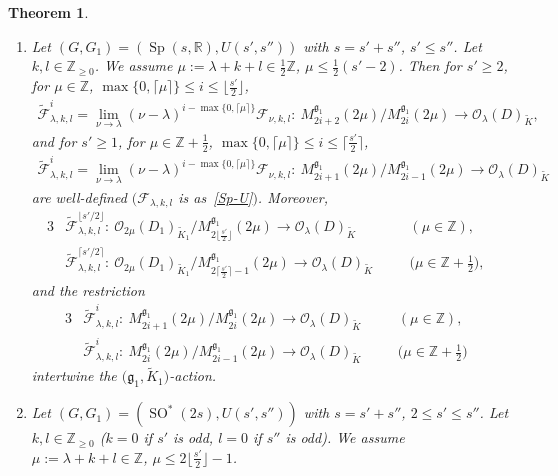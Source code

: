 \documentclass[pdftex]{sigma}
\numberwithin{equation}{section}
\newtheorem{Theorem}{Theorem}[section]
\newcommand{\BZ}{\mathbb{Z}}
\newcommand{\BR}{\mathbb{R}}
\newcommand{\fg}{\mathfrak{g}}
\newcommand{\cF}{\mathcal{F}}
\newcommand{\cO}{\mathcal{O}}
\begin{document}
\begin{Theorem}\quad
\begin{enumerate}\itemsep=0pt
\item[$(1)$] Let $(G,G_1)=(\operatorname{Sp}(s,\BR),U(s',s''))$ with $s=s'+s''$, $s'\le s''$. Let $k,l\in\BZ_{\ge 0}$. We assume $\mu:=\lambda+k+l\in\frac{1}{2}\BZ$, $\mu\le \frac{1}{2}(s'-2)$. Then for $s'\ge 2$, for $\mu\in\BZ$, $\max\{0,\lceil\mu\rceil\}\le i\le \big\lfloor \frac{s'}{2}\big\rfloor$,
\begin{gather*} \tilde{\cF}^i_{\lambda,k,l}=\lim_{\nu\to\lambda}(\nu-\lambda)^{i-\max\{0,\lceil \mu\rceil\}}\cF_{\nu,k,l}
\colon \ M_{2i+2}^{\fg_1}(2\mu)/M_{2i}^{\fg_1}(2\mu)\to \cO_\lambda(D)_{\tilde{K}}, \end{gather*}
and for $s'\ge 1$, for $\mu\in\BZ+\frac{1}{2}$, $\max\{0,\lceil\mu\rceil\}\le i\le \big\lceil \frac{s'}{2}\big\rceil$,
\begin{gather*} \tilde{\cF}^i_{\lambda,k,l}=\lim_{\nu\to\lambda}(\nu-\lambda)^{i-\max\{0,\lceil \mu\rceil\}}\cF_{\nu,k,l}
\colon \ M_{2i+1}^{\fg_1}(2\mu)/M_{2i-1}^{\fg_1}(2\mu)\to \cO_\lambda(D)_{\tilde{K}} \end{gather*}
are well-defined $(\cF_{\lambda,k,l}$ is as~\eqref{Sp-U}$)$. Moreover,
\begin{alignat*}{3}
&\tilde{\cF}^{\lfloor s'/2\rfloor}_{\lambda,k,l}\colon \ \cO_{2\mu}(D_1)_{\tilde{K}_1}
/M_{2\lfloor \frac{s'}{2}\rfloor}^{\fg_1}(2\mu)\longrightarrow \cO_\lambda(D)_{\tilde{K}}\quad && (\mu\in\BZ), &\\
&\tilde{\cF}^{\lceil s'/2\rceil}_{\lambda,k,l}\colon \ \cO_{2\mu}(D_1)_{\tilde{K}_1}
/M_{2\lceil \frac{s'}{2}\rceil-1}^{\fg_1}(2\mu)\longrightarrow \cO_\lambda(D)_{\tilde{K}} \quad & &\big(\mu\in\BZ+\tfrac{1}{2}\big),&
\end{alignat*}
and the restriction
\begin{alignat*}{3}
&\tilde{\cF}^i_{\lambda,k,l}\colon \ M_{2i+1}^{\fg_1}(2\mu)/M_{2i}^{\fg_1}(2\mu)\to \cO_\lambda(D)_{\tilde{K}} \quad && (\mu\in\BZ),& \\
&\tilde{\cF}^i_{\lambda,k,l}\colon \ M_{2i}^{\fg_1}(2\mu)/M_{2i-1}^{\fg_1}(2\mu)\to \cO_\lambda(D)_{\tilde{K}} \quad && \big(\mu\in\BZ+\tfrac{1}{2}\big)&
\end{alignat*}
intertwine the $\big(\fg_1,\tilde{K}_1\big)$-action.
\item[$(2)$] Let $(G,G_1)=(\operatorname{SO}^*(2s),U(s',s''))$ with $s=s'+s''$, $2\le s'\le s''$.
Let $k,l\in\BZ_{\ge 0}$ ($k=0$ if $s'$ is odd, $l=0$ if $s''$ is odd).
We assume $\mu:=\lambda+k+l\in\BZ$, $\mu\le 2\big\lfloor \frac{s'}{2}\big\rfloor-1$.

\end{enumerate}
\end{Theorem}
\end{document}

